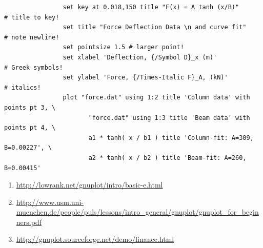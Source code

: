 \documentclass{beamer}
\begin{document}
\begin{frame}
\begin{verbatim}
				set key at 0.018,150 title "F(x) = A tanh (x/B)"       # title to key!
				set title "Force Deflection Data \n and curve fit"     # note newline!
				set pointsize 1.5 # larger point!
				set xlabel 'Deflection, {/Symbol D}_x (m)'             # Greek symbols!
				set ylabel 'Force, {/Times-Italic F}_A, (kN)'          # italics!
				plot "force.dat" using 1:2 title 'Column data' with points pt 3, \
				       "force.dat" using 1:3 title 'Beam data' with points pt 4, \
				       a1 * tanh( x / b1 ) title 'Column-fit: A=309, B=0.00227', \
				       a2 * tanh( x / b2 ) title 'Beam-fit: A=260, B=0.00415'
			\end{verbatim}
		\end{frame}

%		
		\begin{frame}
			\scriptsize
			\begin{enumerate}
				\item \url{http://lowrank.net/gnuplot/intro/basic-e.html}
				\item \url{http://www.usm.uni-muenchen.de/people/puls/lessons/intro_general/gnuplot/gnuplot_for_beginners.pdf}	
				\item \url{http://gnuplot.sourceforge.net/demo/finance.html}
			\end{enumerate}				
		\end{frame}
\end{document}
